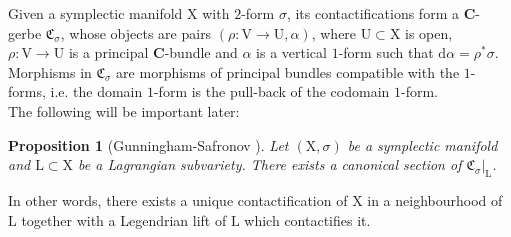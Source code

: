 \documentclass{article}
\theoremstyle{plain}
\newtheorem{proposition}[theorem]{Proposition}
\theoremstyle{definition}
\theoremstyle{remark}
\newcommand{\mr}{\mathrm}
\newcommand{\C}{\mathbf C}
\newcommand{\3}{\vspace{3mm}}
\newcommand{\2}{\vspace{2mm}}
\newcommand{\1}{\vspace{1mm}}
\begin{document}
Given a symplectic manifold $\mr{X}$ with $2$-form $\sigma$, its contactifications form a $\C$-gerbe $\mathbf{\mathfrak{C}}_\sigma$, whose objects are pairs $(\rho:\mr{V}\to \mr{U},\alpha)$, where $\mr{U}\subset \mr{X}$ is open, $\rho:\mr{V}\to \mr{U}$ is a principal $\C$-bundle and $\alpha$ is a vertical $1$-form such that $\mr{d}\alpha=\rho^*\sigma$. Morphisms in $\mathbf{\mathfrak{C}}_\sigma$ are morphisms of principal bundles compatible with the $1$-forms, i.e. the domain $1$-form is the pull-back of the codomain $1$-form.\\
The following will be important later:
\2
\begin{proposition}[Gunningham-Safronov \cite{saf}]
Let $(\mr{X},\sigma)$ be a symplectic manifold and $\mr{L}\subset \mr{X}$ be a Lagrangian subvariety. There exists a canonical section of $\mathbf{\mathfrak{C}}_\sigma|_\mr{L}$.
\end{proposition}
In other words, there exists a unique contactification of $\mr{X}$ in a neighbourhood of $\mr{L}$ together with a Legendrian lift of $\mr{L}$ which contactifies it.
\end{document}
